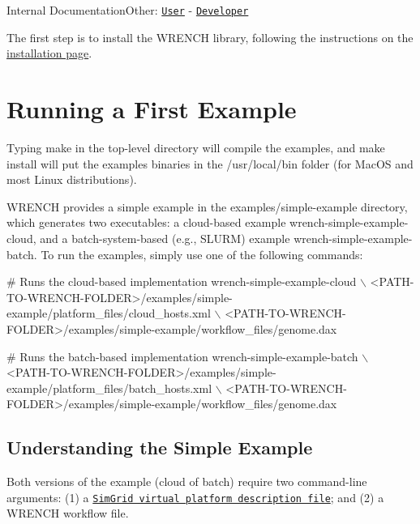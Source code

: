 Internal DocumentationOther\+: \href{../user/getting-started.html}{\tt User} -\/ \href{../developer/getting-started.html}{\tt Developer}

The first step is to install the W\+R\+E\+N\+CH library, following the instructions on the \hyperlink{install}{installation page}.\hypertarget{getting-started_getting-started-example}{}\section{Running a First Example}\label{getting-started_getting-started-example}
Typing {\ttfamily make} in the top-\/level directory will compile the examples, and {\ttfamily make install} will put the examples binaries in the {\ttfamily /usr/local/bin} folder (for Mac\+OS and most Linux distributions).

W\+R\+E\+N\+CH provides a simple example in the {\ttfamily examples/simple-\/example} directory, which generates two executables\+: a cloud-\/based example {\ttfamily wrench-\/simple-\/example-\/cloud}, and a batch-\/system-\/based (e.\+g., S\+L\+U\+RM) example {\ttfamily wrench-\/simple-\/example-\/batch}. To run the examples, simply use one of the following commands\+:


\begin{DoxyCode}
# Runs the cloud-based implementation
wrench-simple-example-cloud \(\backslash\)
    <PATH-TO-WRENCH-FOLDER>/examples/simple-example/platform\_files/cloud\_hosts.xml \(\backslash\)
    <PATH-TO-WRENCH-FOLDER>/examples/simple-example/workflow\_files/genome.dax

# Runs the batch-based implementation
wrench-simple-example-batch \(\backslash\)
    <PATH-TO-WRENCH-FOLDER>/examples/simple-example/platform\_files/batch\_hosts.xml \(\backslash\)
    <PATH-TO-WRENCH-FOLDER>/examples/simple-example/workflow\_files/genome.dax
\end{DoxyCode}
\hypertarget{getting-started_getting-started-example-simple}{}\subsection{Understanding the Simple Example}\label{getting-started_getting-started-example-simple}
Both versions of the example (cloud of batch) require two command-\/line arguments\+: (1) a \href{http://simgrid.gforge.inria.fr/simgrid/3.19/doc/platform.html}{\tt Sim\+Grid virtual platform description file}; and (2) a W\+R\+E\+N\+CH workflow file.


